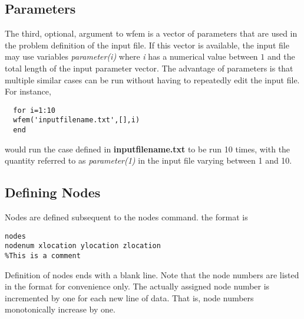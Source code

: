 \documentclass[12pt]{article}
\newcommand*{\command}[1]{\textsf{#1}}
\newcommand*{\variable}[1]{\textit{#1}}
\newcommand*{\filename}[1]{\textsf{\textbf{#1}}}
\begin{document}
\subsection{Parameters}
The third, optional, argument to \command{wfem} is a vector of parameters that are used in the problem definition of the input file. If this vector is available, the input file may use variables \variable{parameter(i)} where \variable{i} has a numerical value between $1$ and the total length of the input parameter vector. The advantage of parameters is that multiple similar cases can be run without having to repeatedly edit the input file. For instance, 
\begin{lstlisting}
  for i=1:10
  wfem('inputfilename.txt',[],i)
  end
\end{lstlisting}
would run the case defined in \filename{inputfilename.txt} to be run 10 times, with the quantity referred to as \variable{parameter(1)} in the input file varying between 1 and 10.

\subsection{Defining Nodes}
\label{command:nodes}
Nodes are defined subsequent to the \command{nodes} command. the format is 
\begin{lstlisting}
nodes
nodenum xlocation ylocation zlocation
%This is a comment
\end{lstlisting}
Definition of nodes ends with a blank line. Note that the node numbers are listed in the format for convenience only. The actually assigned node number is incremented by one for each new line of data. That is, node numbers monotonically increase by one.
\end{document}
